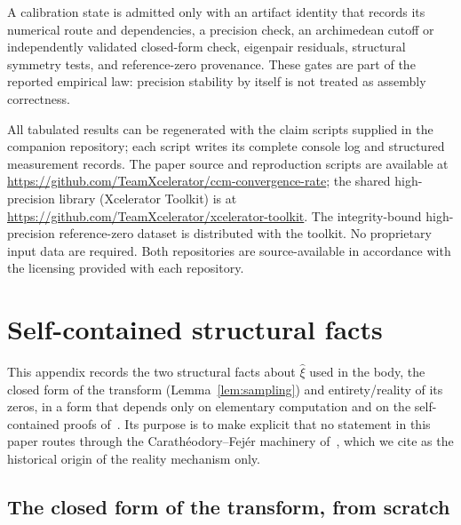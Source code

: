 \documentclass[11pt,a4paper]{article}
\begin{document}
A calibration state is admitted only with an artifact identity that records
its numerical route and dependencies, a precision check, an archimedean cutoff
or independently validated closed-form check, eigenpair residuals, structural
symmetry tests, and reference-zero provenance. These gates are part of the
reported empirical law: precision stability by itself is not treated as
assembly correctness.

All tabulated results can be regenerated with the claim scripts supplied in
the companion repository; each script writes its complete console log and
structured measurement records. The paper source and reproduction scripts are available at
\url{https://github.com/TeamXcelerator/ccm-convergence-rate}; the shared
high-precision library (Xcelerator Toolkit) is at
\url{https://github.com/TeamXcelerator/xcelerator-toolkit}. The integrity-bound
high-precision reference-zero dataset is distributed with the toolkit. No
proprietary input data are required. Both repositories are source-available in
accordance with the licensing provided with each repository.

\appendix
\section{Self-contained structural facts}\label{app:selfcontained}

This appendix records the two structural facts about $\widehat\xi$ used in the
body, the closed form of the transform (Lemma~\ref{lem:sampling}) and
entirety/reality of its zeros, in a form that depends only on elementary
computation and on the self-contained proofs of~\cite{CCM2025}. Its purpose is
to make explicit that no statement in this paper routes through the
Carath\'eodory--Fej\'er machinery of~\cite{CvS2025}, which we cite as the
historical origin of the reality mechanism only.

\subsection{The closed form of the transform, from scratch}\label{app:closedform}
\end{document}
